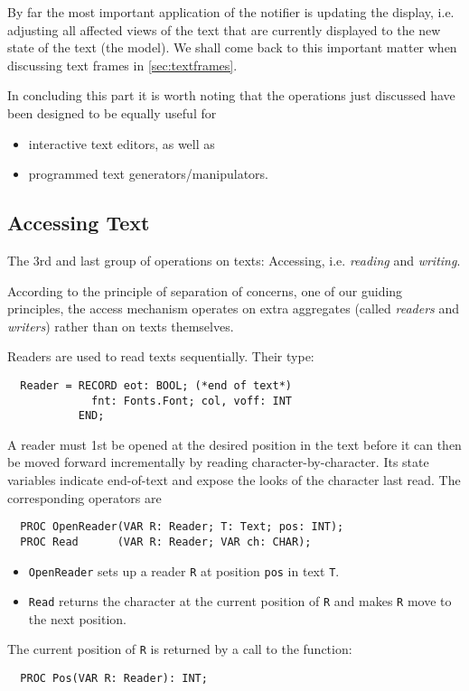 By far the most important application of the notifier is updating the display,
i.e. adjusting all affected views of the text
that are currently displayed to the new state of the text (the model).
We shall come back to this important matter when discussing text frames in \ref{sec:textframes}.

In concluding this part it is worth noting that
the operations just discussed have been designed to be equally useful for
\begin{itemize}
  \item interactive text editors, as well as
  \item programmed text generators/manipulators.
\end{itemize}

\subsection{Accessing Text}
The 3rd and last group of operations on texts:
Accessing, i.e. \emph{reading} and \emph{writing}.

According to the principle of separation of concerns, one of our guiding principles,
the access mechanism operates on extra aggregates
(called \emph{readers} and \emph{writers}) rather than on texts themselves.

Readers are used to read texts sequentially. Their type:
\begin{verbatim}
  Reader = RECORD eot: BOOL; (*end of text*)
             fnt: Fonts.Font; col, voff: INT
           END;
\end{verbatim}

A reader must 1st be opened at the desired position in the text
before it can then be moved forward incrementally by reading character-by-character.
Its state variables indicate end-of-text and expose the looks of the character last read.
The corresponding operators are
\begin{verbatim}
  PROC OpenReader(VAR R: Reader; T: Text; pos: INT);
  PROC Read      (VAR R: Reader; VAR ch: CHAR);
\end{verbatim}
\begin{itemize}
  \item \verb|OpenReader| sets up a reader \verb|R| at position \verb|pos| in text \verb|T|.
  \item \verb|Read| returns the character at the current position of \verb|R|
    and makes \verb|R| move to the next position.
\end{itemize}
The current position of \verb|R| is returned by a call to the function:
\begin{verbatim}
  PROC Pos(VAR R: Reader): INT;
\end{verbatim}

